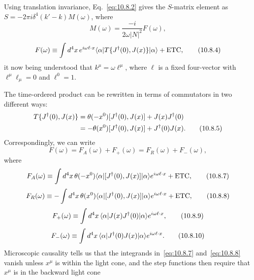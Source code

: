 Using translation invariance, Eq.~\eqref{eq:10.8.2} gives the $S$-matrix
element as $S=-2\pi i\delta^4(k'-k)M(\omega)$, where
\begin{equation}
  M(\omega)=\frac{-i}{2\omega|N|^2}F(\omega),
  \tag{10.8.3}\label{eq:10.8.3}
\end{equation}
\begin{equation}
  F(\omega)\equiv\int d^4x\,e^{i\omega\ell\cdot x}
  \langle \alpha\rvert T\{J^\dagger(0),J(x)\}\lvert \alpha\rangle+\mathrm{ETC},
  \tag{10.8.4}\label{eq:10.8.4}
\end{equation}
it now being understood that $k^\mu=\omega\ell^\mu$, where $\ell$ is a
fixed four-vector with $\ell^\mu\ell_\mu=0$ and $\ell^0=1$.

The time-ordered product can be rewritten in terms of commutators in two
different ways:
\begin{align}
  T\{J^\dagger(0),J(x)\}
  &=\theta(-x^0)[J^\dagger(0),J(x)]+J(x)J^\dagger(0)\notag\\
  &=-\theta(x^0)[J^\dagger(0),J(x)]+J^\dagger(0)J(x).
  \tag{10.8.5}\label{eq:10.8.5}
\end{align}
Correspondingly, we can write
\begin{equation}
  F(\omega)=F_A(\omega)+F_+(\omega)=F_R(\omega)+F_-(\omega),
  \tag{10.8.6}\label{eq:10.8.6}
\end{equation}
where
\begin{equation}
  F_A(\omega)\equiv\int d^4x\,\theta(-x^0)
  \langle \alpha\rvert[J^\dagger(0),J(x)]\lvert \alpha\rangle
  e^{i\omega\ell\cdot x}+\mathrm{ETC},
  \tag{10.8.7}\label{eq:10.8.7}
\end{equation}
\begin{equation}
  F_R(\omega)\equiv-\int d^4x\,\theta(x^0)
  \langle \alpha\rvert[J^\dagger(0),J(x)]\lvert \alpha\rangle
  e^{i\omega\ell\cdot x}+\mathrm{ETC},
  \tag{10.8.8}\label{eq:10.8.8}
\end{equation}
\begin{equation}
  F_+(\omega)\equiv\int d^4x\,
  \langle \alpha\rvert J(x)J^\dagger(0)\lvert \alpha\rangle e^{i\omega\ell\cdot x},
  \tag{10.8.9}\label{eq:10.8.9}
\end{equation}
\begin{equation}
  F_-(\omega)\equiv\int d^4x\,
  \langle \alpha\rvert J^\dagger(0)J(x)\lvert \alpha\rangle e^{i\omega\ell\cdot x}.
  \tag{10.8.10}\label{eq:10.8.10}
\end{equation}
Microscopic causality tells us that the integrands in~\eqref{eq:10.8.7}
and~\eqref{eq:10.8.8} vanish unless $x^\mu$ is within the light cone, and
the step functions then require that $x^\mu$ is in the backward light cone
